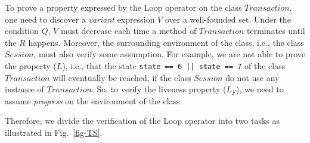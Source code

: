 

 To prove a property expressed by the 
\textsf{Loop} operator on the class $Transaction$, 
one need to discover a \textit{variant} 
expression $V$ over a well-founded set. 
Under the condition $Q$,
$V$ must decrease each time a method of $Transaction$ terminates
until the $R$ happens.  %
Moreover, the surrounding environment of the class, i.e., 
the class $Session$, must also verify some assumption. For example,
we are not able to prove the property ($L$), i.e., that the state 
\texttt{state == 6 || state == 7}
of the class $Transaction$ will eventually be reached, if the 
class $Session$ do not use any instance of $Transaction$. %
So, to verify the liveness property ($L_F$), 
we need to assume \textit{progress}
on the environment of the class.

Therefore, we divide the verification of the \textsf{Loop}
operator into two tasks as illustrated in Fig.~\ref{fig-TS}.




